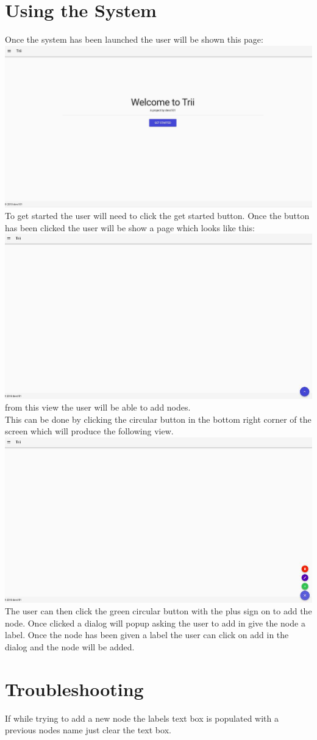 \documentclass{article}
\begin{document}
\section{Using the System}
Once the system has been launched the user will be shown this page:\\
\includegraphics[scale=0.25]{landingpage}\\
To get started the user will need to click the get started button. Once the button has been clicked the user will be show a page which looks like this:\\
\includegraphics[scale=0.49]{treeView}\\
from this view the user will be able to add nodes.\\
This can be done by clicking the circular button in the bottom right corner of the screen which will produce the following view.\\
\includegraphics[scale=0.49]{fabSelected}\\
The user can then click the green circular button with the plus sign on to add the node. Once clicked a dialog will popup asking the user to add in give the node a label. Once the node has been given a label the user can click on add in the dialog and the node will be added.
\section{Troubleshooting}
If while trying to add a new node the labels text box is populated with a previous nodes name just clear the text box.
\end{document}
